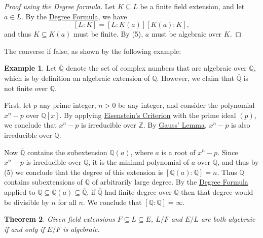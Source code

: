 \documentclass[12pt]{report}
\newtheorem{theorem}{Theorem}[chapter]
\numberwithin{equation}{section}
\numberwithin{theorem}{chapter}
\theoremstyle{definition}
\newtheorem{example}[theorem]{Example}
\newtheorem*{basic properties}{Basic Properties}
\newtheorem*{Important Remark}{Important Remark}
\begin{document}
\begin{proof}[Proof using the Degree formula]
	Let $K \subseteq L$ be a finite field extension, and let $a \in L$. By the \hyperref[deg formula]{Degree Formula}, we have 
	$$[L : K] = [L : K(a)][K(a): K],$$
	and thus $K \subseteq K(a)$ must be finite. By  (5), $a$ must be algebraic over $K$.
\end{proof}


The converse if false, as shown by the following example:

\begin{example}\label{example closure of Q}
Let $\overline{\mathbb{Q}}$ denote the set of complex numbers that are algebraic over $\mathbb{Q}$, which is by definition an algebraic extension of $\mathbb{Q}$. However, we claim that $\overline{\mathbb{Q}}$ is not finite over $\mathbb{Q}$. 

First, let $p$ any prime integer, $n>0$ be any integer, and consider the polynomial $x^n-p$ over $\mathbb{Q}[x]$. By applying \hyperref[eisenstein criterion]{Eisenstein's Criterion} with the prime ideal $(p)$, we conclude that $x^n-p$ is irreducible over $\mathbb{Z}$. By \hyperref[Gauss Lemma]{Gauss' Lemma}, $x^n-p$ is also irreducible over $\mathbb{Q}$. 

Now $\overline{\mathbb{Q}}$ contains the subextension $\mathbb{Q}(a)$, where $a$ is a root of $x^n-p$. Since $x^n-p$ is irreducible over $\mathbb{Q}$, it is the minimal polynomial of $a$ over $\mathbb{Q}$, and thus by  (5) we conclude that the degree of this extension is $[\mathbb{Q}(a):\mathbb{Q}]=n$. Thus $\mathbb{Q}$ contains subextensions of $\mathbb{Q}$ of arbitrarily large degree. By the \hyperref[deg formula]{Degree Formula} applied to $\mathbb{Q} \subseteq \mathbb{Q}(a) \subseteq \overline{\mathbb{Q}}$, if $\overline{\mathbb{Q}}$ had finite degree over $\mathbb{Q}$ then that degree would be divisible by $n$ for all $n$. We conclude that $[\mathbb{Q} : \mathbb{Q}] = \infty$.
\end{example}


\begin{theorem}\label{algebraictower}
Given field extensions $F \subseteq L \subseteq E$, $L/F$ and $E/L$ are both algebraic if and only if $E/F$ is algebraic.
\end{theorem}
\end{document}
